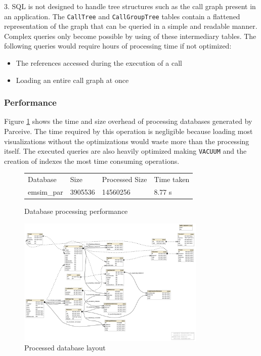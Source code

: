 3. SQL is not designed to handle tree structures such as the call graph present in an application. The \texttt{CallTree} and \texttt{CallGroupTree} tables contain a flattened representation of the graph that can be queried in a simple and readable manner. Complex queries only become possible by using of these intermediary tables. The following queries would require hours of processing time if not optimized:

\begin{itemize}
	\item The references accessed during the execution of a call
	\item Loading an entire call graph at once
\end{itemize}

\subsubsection{Performance}

Figure \ref{parceive:procperformance} shows the time and size overhead of processing databases generated by Parceive. The time required by this operation is negligible because loading most visualizations without the optimizations would waste more than the processing itself. The executed queries are also heavily optimized making \texttt{VACUUM} and the creation of indexes the most time consuming operations.

\begin{figure}
	\centering
	\begin{tabular}{l l l l}
		Database & Size & Processed Size & Time taken \\
		emsim\_par & 3905536 & 14560256 & 8.77 s
	\end{tabular}
	\caption{Database processing performance}
	\label{parceive:procperformance}
\end{figure}

\begin{figure}
	\centering
	\includegraphics[width=0.8\textwidth]{full-schema}
	\caption{Processed database layout}
	\label{parceive:proclayout}
\end{figure}

